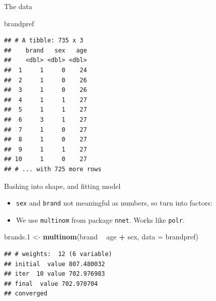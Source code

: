 \documentclass[
  ignorenonframetext,
]{beamer}
\newenvironment{Shaded}{\begin{snugshade}}{\end{snugshade}}
\newcommand{\DataTypeTok}[1]{\textcolor[rgb]{0.13,0.29,0.53}{#1}}
\newcommand{\FloatTok}[1]{\textcolor[rgb]{0.00,0.00,0.81}{#1}}
\newcommand{\KeywordTok}[1]{\textcolor[rgb]{0.13,0.29,0.53}{\textbf{#1}}}
\newcommand{\NormalTok}[1]{#1}
\newcommand{\OperatorTok}[1]{\textcolor[rgb]{0.81,0.36,0.00}{\textbf{#1}}}
\newcommand{\StringTok}[1]{\textcolor[rgb]{0.31,0.60,0.02}{#1}}
\providecommand{\tightlist}{%
  \setlength{\itemsep}{0pt}\setlength{\parskip}{0pt}}
\begin{document}
\begin{frame}[fragile]{The data}
\protect\hypertarget{the-data-4}{}

\begin{Shaded}
\begin{Highlighting}[]
\NormalTok{brandpref}
\end{Highlighting}
\end{Shaded}

\begin{verbatim}
## # A tibble: 735 x 3
##    brand   sex   age
##    <dbl> <dbl> <dbl>
##  1     1     0    24
##  2     1     0    26
##  3     1     0    26
##  4     1     1    27
##  5     1     1    27
##  6     3     1    27
##  7     1     0    27
##  8     1     0    27
##  9     1     1    27
## 10     1     0    27
## # ... with 725 more rows
\end{verbatim}

\end{frame}

\begin{frame}[fragile]{Bashing into shape, and fitting model}
\protect\hypertarget{bashing-into-shape-and-fitting-model}{}

\begin{itemize}
\tightlist
\item
  \texttt{sex} and \texttt{brand} not meaningful as numbers, so turn
  into factors:
\end{itemize}

\begin{Shaded}
\end{Shaded}

\begin{itemize}
\tightlist
\item
  We use \texttt{multinom} from package \texttt{nnet}. Works like
  \texttt{polr}.
\end{itemize}

\begin{Shaded}
\begin{Highlighting}[]
\NormalTok{brands}\FloatTok{.1}\NormalTok{ <-}\StringTok{ }\KeywordTok{multinom}\NormalTok{(brand }\OperatorTok{~}\StringTok{ }\NormalTok{age }\OperatorTok{+}\StringTok{ }\NormalTok{sex, }\DataTypeTok{data =}\NormalTok{ brandpref)}
\end{Highlighting}
\end{Shaded}

\begin{verbatim}
## # weights:  12 (6 variable)
## initial  value 807.480032 
## iter  10 value 702.976983
## final  value 702.970704 
## converged
\end{verbatim}

\end{frame}
\end{document}
